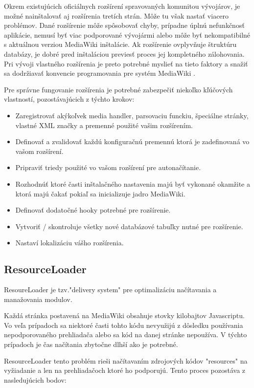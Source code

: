 Okrem existujúcich oficiálnych rozšírení spravovaných komunitou vývojárov, je možné nainštalovať aj rozšírenia tretích strán. Môže tu však nastať viacero problémov. Dané rozšírenie môže spôsobovať chyby, prípadne úplnú nefunkčnosť aplikácie, nemusí byť viac podporované vývojármi alebo môže byť nekompatibilné s aktuálnou verziou MediaWiki inštalácie. Ak rozšírenie ovplyvňuje štruktúru databázy, je dobré pred inštaláciou previesť proces jej kompletného zálohovania. Pri vývoji vlastného rozšírenia je preto potrebné myslieť na tieto faktory a snažiť sa dodržiavať konvencie programovania pre systém MediaWiki \cite{MediaWikiConventions}. 

Pre správne fungovanie rozšírenia je potrebné zabezpečiť niekoľko kľúčových vlastností, pozostávajúcich z týchto krokov:
\begin{itemize}
	\item Zaregistrovať akýkoľvek media handler, parsovaciu funckiu, špeciálne stránky, vlastné XML značky a premenné použité vašim rozšírením.
	\item Definovať a zvalidovať každú konfiguračnú premennú ktorá je zadefinovaná vo vašom rozšírení.
	\item Pripraviť triedy použité vo vašom rozšírení pre autonačítanie.
	\item Rozhodnúť ktoré časti inštalačného nastavenia majú byť vykonané okamžite a ktorá majú čakať pokiaľ sa inicializuje jadro MediaWiki.
	\item Definovať dodatočné hooky potrebné pre rozšírenie.
	\item Vytvoriť / skontroluje všetky nové databázové tabuľky nutné pre rozšírenie.
	\item Nastaví lokalizáciu vášho rozšírenia.
\end{itemize}

\subsection{ResourceLoader}

ResoureLoader je tzv."delivery system" pre optimalizáciu načítavania a manažovania modulov.

Každá stránka postavená na MediaWiki obsahuje stovky kilobajtov Javascriptu. Vo veľa prípadoch sa niektoré časti tohto kódu nevyužijú z dôsledku používania nepodporovaného prehliadača alebo sa kód na danej stránke nepoužíva. V týchto prípadoch je čas načítania zbytočne dlhší ako je potrebné.

ResourceLoader tento problém rieši načítavaním zdrojových kódov "resources" na vyžiadanie a len na prehliadačoch ktoré ho podporujú. Tento proces pozostáva z nasledujúcich bodov:

